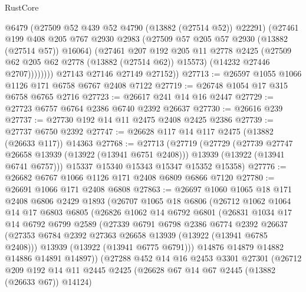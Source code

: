 \begin{lexlean}{RustCore}
\begin{coremodule}
                  @6479
                  (@27509 @52 @439 @52 @4790 (@13882 (@27514 @52)) @22291)
                  (@27461
                    @199
                    @408
                    @205
                    @767
                    @2930
                    @2983
                    (@27509 @57 @205 @57 @2930 (@13882 (@27514 @57)) @16064)
                    (@27461
                      @207
                      @192
                      @205
                      @11
                      @2778
                      @2425
                      (@27509 @62 @205 @62 @2778 (@13882 (@27514 @62)) @15573)
                      (@14232 @27446 @2707))))))))
        @27143
        @27146
        @27149
        @27152))
@27713 := @26597 @1055 @1066 @1126 @171 @6758 @6767 @2408 @7122
@27719 := @26748 @1054 @17 @315 @6758 @6765 @2716
@27723 := @26617 @241 @14 @16 @2447
@27729 := @27723 @6757 @6764 @2386 @6740 @2392 @26637
@27730 := @26616 @239
@27737 := @27730 @192 @14 @11 @2475 @2408 @2425 @2386
@27739 := @27737 @6750 @2392
@27747 := @26628 @117 @14 @117 @2475 (@13882 (@26633 @117)) @14363
@27768 := @27713
    (@27719
      (@27729
        (@27739 @27747 @26658 @13939 (@13922 (@13941 @6751 @2408)))
        @13939
        (@13922 (@13941 @6741 @6757)))
      @15337
      @15340
      @15343
      @15347
      @15352
      @15358)
@27776 := @26682 @6767 @1066 @1126 @171 @2408 @6809 @6866 @7120
@27780 := @26691 @1066 @171 @2408 @6808
@27863 := @26697
    @1060
    @1065
    @18
    @171
    @2408
    @6806
    @2429
    @1893
    (@26707
      @1065
      @18
      @6806
      (@26712
        @1062
        @1064
        @14
        @17
        @6803
        @6805
        (@26826
          @1062
          @14
          @6792
          @6801
          (@26831
            @1034
            @17
            @14
            @6792
            @6799
            @2589
            (@27339
              @6791
              @6798
              @2386
              @6774
              @2392
              @26637
              (@27353 @6784 @2392 @27363 @26658 @13939 (@13922 (@13941 @6785 @2408)))
              @13939
              (@13922 (@13941 @6775 @6791)))
            @14876
            @14879
            @14882
            @14886
            @14891
            @14897))
        (@27288
          @452
          @14
          @16
          @2453
          @3301
          @27301
          (@26712
            @209
            @192
            @14
            @11
            @2445
            @2425
            (@26628 @67 @14 @67 @2445 (@13882 (@26633 @67)) @14124)

\end{coremodule}
\end{lexlean}

